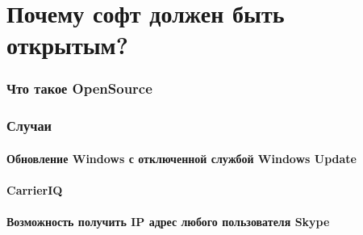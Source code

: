 \part{Почему софт должен быть открытым?}
\section{Что такое OpenSource}
\section{Случаи}
\subsection{Обновление Windows с отключенной службой Windows Update}
\subsection{CarrierIQ}
\subsection{Возможность получить IP адрес любого пользователя Skype}